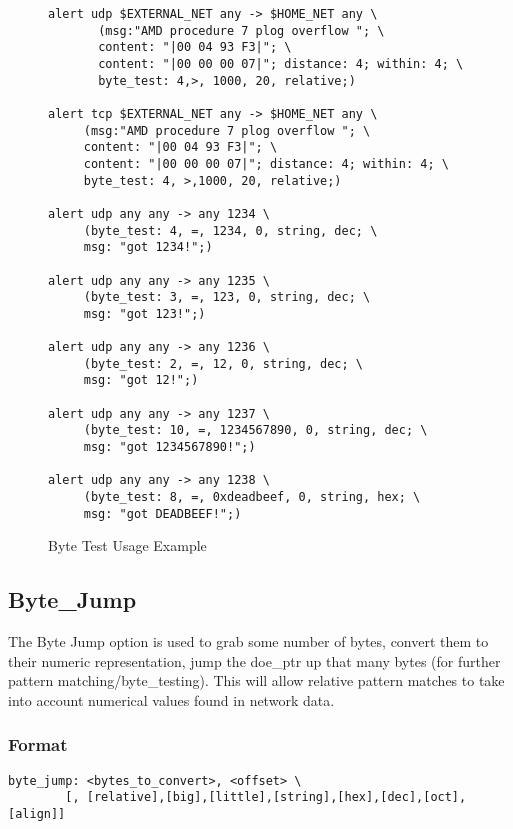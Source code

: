 \documentclass[english]{report}
\begin{document}
\begin{figure}[!hbpt]
\begin{verbatim}
alert udp $EXTERNAL_NET any -> $HOME_NET any \
       (msg:"AMD procedure 7 plog overflow "; \
       content: "|00 04 93 F3|"; \
       content: "|00 00 00 07|"; distance: 4; within: 4; \
       byte_test: 4,>, 1000, 20, relative;)

alert tcp $EXTERNAL_NET any -> $HOME_NET any \
     (msg:"AMD procedure 7 plog overflow "; \
     content: "|00 04 93 F3|"; \
     content: "|00 00 00 07|"; distance: 4; within: 4; \
     byte_test: 4, >,1000, 20, relative;)

alert udp any any -> any 1234 \
     (byte_test: 4, =, 1234, 0, string, dec; \
     msg: "got 1234!";)

alert udp any any -> any 1235 \
     (byte_test: 3, =, 123, 0, string, dec; \
     msg: "got 123!";)

alert udp any any -> any 1236 \
     (byte_test: 2, =, 12, 0, string, dec; \
     msg: "got 12!";)

alert udp any any -> any 1237 \
     (byte_test: 10, =, 1234567890, 0, string, dec; \
     msg: "got 1234567890!";)

alert udp any any -> any 1238 \
     (byte_test: 8, =, 0xdeadbeef, 0, string, hex; \
     msg: "got DEADBEEF!";)
\end{verbatim}
\caption{Byte Test Usage Example \label{fig:Byte_Test}}
\end{figure}

\subsection{Byte\_Jump\label{sub:Byte_Jump}}

The Byte Jump option is used to grab some number of bytes, convert
them to their numeric representation, jump the doe\_ptr up that many
bytes (for further pattern matching/byte\_testing).  This will allow
relative pattern matches to take into account numerical values found
in network data.

\subsubsection{Format}

\begin{verbatim}
byte_jump: <bytes_to_convert>, <offset> \
        [, [relative],[big],[little],[string],[hex],[dec],[oct],[align]]
\end{verbatim}
\end{document}
